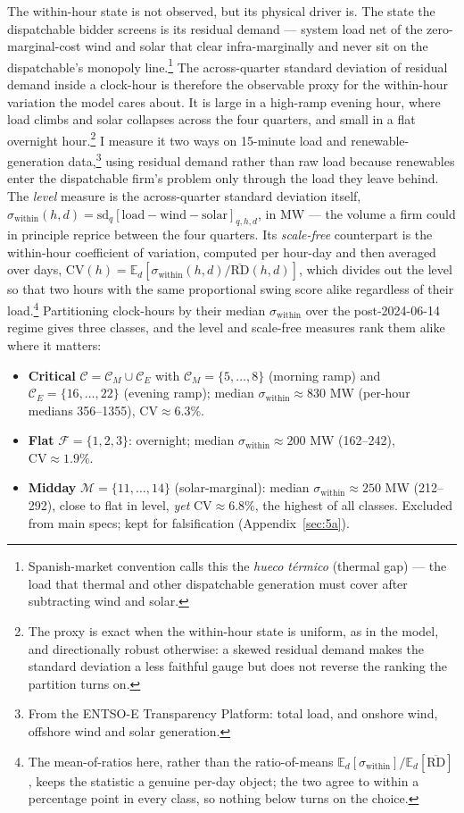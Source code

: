 \documentclass[11pt,a4paper]{article}
\theoremstyle{definition}
\theoremstyle{remark}
\theoremstyle{plain}
\begin{document}
The within-hour state is not observed, but its physical driver is. The state the dispatchable bidder screens is its residual demand --- system load net of the zero-marginal-cost wind and solar that clear infra-marginally and never sit on the dispatchable's monopoly line.\footnote{Spanish-market convention calls this the \emph{hueco t\'ermico} (thermal gap) --- the load that thermal and other dispatchable generation must cover after subtracting wind and solar.} The across-quarter standard deviation of residual demand inside a clock-hour is therefore the observable proxy for the within-hour variation the model cares about. It is large in a high-ramp evening hour, where load climbs and solar collapses across the four quarters, and small in a flat overnight hour.\footnote{The proxy is exact when the within-hour state is uniform, as in the model, and directionally robust otherwise: a skewed residual demand makes the standard deviation a less faithful gauge but does not reverse the ranking the partition turns on.}
I measure it two ways on 15-minute load and renewable-generation data,\footnote{From the ENTSO-E Transparency Platform: total load, and onshore wind, offshore wind and solar generation.} using residual demand rather than raw load because renewables enter the dispatchable firm's problem only through the load they leave behind.
The \emph{level} measure is the across-quarter standard deviation itself, $\sigma_{\text{within}}(h,d) = \mathrm{sd}_q[\text{load}-\text{wind}-\text{solar}]_{q,h,d}$, in MW --- the volume a firm could in principle reprice between the four quarters. Its \emph{scale-free} counterpart is the within-hour coefficient of variation, computed per hour-day and then averaged over days, $\mathrm{CV}(h) = \mathbb{E}_d\!\left[\sigma_{\text{within}}(h,d)\big/\overline{\text{RD}}(h,d)\right]$, which divides out the level so that two hours with the same proportional swing score alike regardless of their load.\footnote{The mean-of-ratios here, rather than the ratio-of-means $\mathbb{E}_d[\sigma_{\text{within}}]/\mathbb{E}_d[\overline{\text{RD}}]$, keeps the statistic a genuine per-day object; the two agree to within a percentage point in every class, so nothing below turns on the choice.} Partitioning clock-hours by their median $\sigma_{\text{within}}$ over the post-2024-06-14 regime gives three classes, and the level and scale-free measures rank them alike where it matters:
\begin{itemize}\setlength{\itemsep}{1pt}
\item \textbf{Critical} $\mathcal{C}=\mathcal{C}_M\cup\mathcal{C}_E$ with $\mathcal{C}_M=\{5,\dots,8\}$ (morning ramp) and $\mathcal{C}_E=\{16,\dots,22\}$ (evening ramp); median $\sigma_{\text{within}}\approx830$ MW (per-hour medians 356--1355), $\mathrm{CV}\approx6.3\%$.
\item \textbf{Flat} $\mathcal{F}=\{1,2,3\}$: overnight; median $\sigma_{\text{within}}\approx200$ MW (162--242), $\mathrm{CV}\approx1.9\%$.
\item \textbf{Midday} $\mathcal{M}=\{11,\dots,14\}$ (solar-marginal): median $\sigma_{\text{within}}\approx250$ MW (212--292), close to flat in level, \emph{yet} $\mathrm{CV}\approx6.8\%$, the highest of all classes. Excluded from main specs; kept for falsification (Appendix~\ref{sec:5a}).
\end{itemize}
\end{document}
